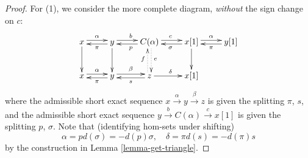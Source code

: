 \begin{proof}
For (1), we consider the more complete diagram, \emph{without} the
sign change on $c$:
$$
\xymatrix{
x\ar@<0.5ex>[r]^{\alpha} \ar[d] &
y\ar@<0.5ex>[l]^{\pi} \ar@<0.5ex>[r]^{b}\ar[d] &
C(\alpha)\ar@<0.5ex>[l]^{p} \ar@<0.5ex>[r]^{c}\ar@{.>}@<0.5ex>[d]^{e} &
x[1]\ar@<0.5ex>[l]^{\sigma} \ar[d]\ar@<0.5ex>[r]^{\alpha} &
y[1]\ar@<0.5ex>[l]^{\pi} \\
x\ar@<0.5ex>[r]^{\alpha} &
y\ar@<0.5ex>[r]^{\beta} \ar@<0.5ex>[l]^{\pi} &
z\ar[r]^{\delta}\ar@<0.5ex>[l]^{s} \ar@{.>}@<0.5ex>[u]^{f} &
x[1]
}
$$
where the admissible short exact sequence
$x\xrightarrow{\alpha} y\xrightarrow{\beta} z$
is given the splitting $\pi$, $s$, and the admissible short exact sequence
$y\xrightarrow{b}C(\alpha)\xrightarrow{c}x[1]$ is given the splitting
$p$, $\sigma$. Note that (identifying hom-sets under shifting)
$$
\alpha = pd(\sigma) = -d(p)\sigma,\quad
\delta = \pi d(s) = -d(\pi)s
$$
by the construction in Lemma \ref{lemma-get-triangle}.


\end{proof}
